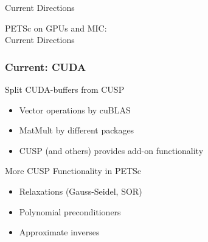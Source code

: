 


\begin{frame}{Current Directions}
  \begin{center}
    \Large PETSc on GPUs and MIC: \\[1em] Current Directions \\[1em]
  \end{center}
\end{frame}


\begin{frame}[fragile]
\frametitle{Current: CUDA}
  \begin{block}{Split CUDA-buffers from CUSP}
  \begin{itemize}
   \item Vector operations by cuBLAS
   \item MatMult by different packages
   \item CUSP (and others) provides add-on functionality
  \end{itemize}
  \end{block}
  
  \begin{block}{More CUSP Functionality in PETSc}
   \begin{itemize}
    \item Relaxations (Gauss-Seidel, SOR)
    \item Polynomial preconditioners
    \item Approximate inverses
   \end{itemize}
  \end{block}

\end{frame}


